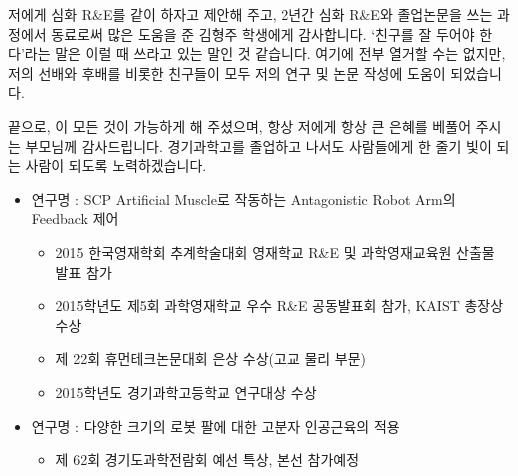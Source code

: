 \begin{acknowledgements}
저에게 심화 R\&E를 같이 하자고 제안해 주고, 2년간 심화 R\&E와 졸업논문을 쓰는 과정에서 동료로써 많은 도움을 준 김형주 학생에게 감사합니다. 
`친구를 잘 두어야 한다'라는 말은 이럴 때 쓰라고 있는 말인 것 같습니다. 여기에 전부 열거할 수는 없지만, 저의 선배와 후배를 비롯한 친구들이 모두 저의 연구 및 논문 작성에 도움이 되었습니다.

끝으로, 이 모든 것이 가능하게 해 주셨으며, 항상 저에게 항상 큰 은혜를 베풀어 주시는 부모님께 감사드립니다. 경기과학고를 졸업하고 나서도 사람들에게 한 줄기 빛이 되는 사람이 되도록 노력하겠습니다.
\end{acknowledgements}

\begin{researches}
\begin{itemize}
	\item 연구명 : SCP Artificial Muscle로 작동하는 Antagonistic Robot Arm의 Feedback 제어
	\begin{itemize}
		\item 2015 한국영재학회 추계학술대회 영재학교 R\&E 및 과학영재교육원 산출물 발표 참가
		\item 2015학년도 제5회 과학영재학교 우수 R\&E 공동발표회 참가, KAIST 총장상 수상
		\item 제 22회 휴먼테크논문대회 은상 수상(고교 물리 부문)
		\item 2015학년도 경기과학고등학교 연구대상 수상
	\end{itemize}
	\item 연구명 : 다양한 크기의 로봇 팔에 대한 고분자 인공근육의 적용
	\begin{itemize}
		\item 제 62회	경기도과학전람회 예선 특상, 본선 참가예정
	\end{itemize}
\end{itemize}
\end{researches}